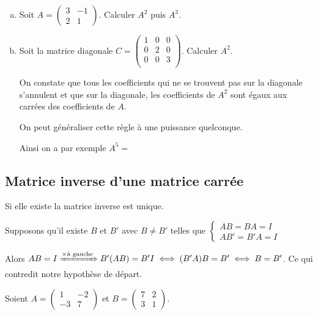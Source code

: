 \documentclass[10pt,a4paper]{article}
\begin{document}
\exes
\begin{enumerate}[a)]
\item  Soit $A=\begin{pmatrix}   3&-1\\2&1  \end{pmatrix}$. Calculer $A^2$ puis $A^3$.
\item Soit la matrice diagonale $C=\begin{pmatrix} 1&0&0 \\ 0&2&0 \\ 0&0&3 \\ \end{pmatrix}$. Calculer $A^2$.

\rema On constate que tous les coefficients qui ne se trouvent pas sur la diagonale s'annulent et que sur la diagonale, les coefficients de $A^2$ sont égaux aux carrées des coefficients de $A$.

On peut généraliser cette règle à une puissance quelconque.

Ainsi on a par exemple $A^5=$
\end{enumerate}

\subsection{Matrice inverse d'une matrice carrée}


\rema Si elle existe la matrice inverse est unique.

\dem Supposons qu'il existe $B$ et $B'$ avec $B \neq B'$ telles que $\left\lbrace \begin{array}{l} AB=BA=I \\ AB'=B'A=I \end{array} \right.$

Alors $AB=I \xRightarrow{\times\text{à gauche}} B'(AB)=B'I \iff (B'A)B=B' \iff B=B'$. Ce qui contredit notre hypothèse de départ.


\exe Soient $A=\begin{pmatrix}   1&-2\\-3&7  \end{pmatrix}$ et $B=\begin{pmatrix}   7&2\\3&1  \end{pmatrix}$.
\end{document}
